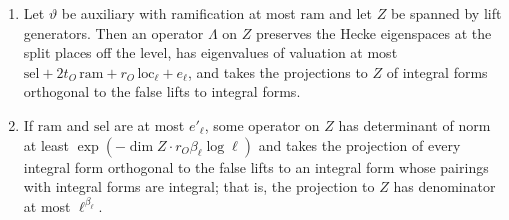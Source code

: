 \begin{theorem}\label{thm:denominator-bound}
\begin{enumerate}[label=\textup{(\alph*)}]
\item Let $\vartheta$ be auxiliary with ramification at most $\mathrm{ram}$ and let $Z$ be spanned by lift generators. Then an operator $\Lambda$ on $Z$ preserves the Hecke eigenspaces at the split places off the level, has eigenvalues of
valuation at most $\mathrm{sel}+2t_O\,\mathrm{ram}+r_O\,\mathrm{loc}_\ell+e_\ell$, and takes the projections to $Z$ of integral forms orthogonal to the false lifts to integral forms.
\item If $\mathrm{ram}$ and $\mathrm{sel}$ are at most $e'_\ell$, some operator on $Z$ has determinant of norm at least $\exp(-\dim Z\cdot r_O\beta_\ell\log\ell)$ and takes the projection of every integral form orthogonal to the false lifts to an
integral form whose pairings with integral forms are integral; that is, the projection to $Z$ has denominator at most $\ell^{\beta_\ell}$.
\end{enumerate}
\end{theorem}

